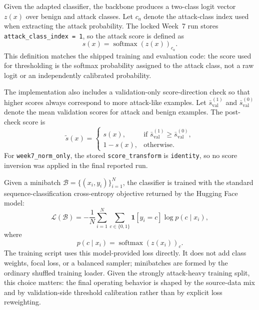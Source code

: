 Given the adapted classifier, the backbone produces a two-class logit vector $z(x)$ over benign and attack classes. Let $c_a$ denote the attack-class index used when extracting the attack probability. The locked Week~7 run stores \texttt{attack\_class\_index = 1}, so the attack score is defined as
\begin{equation}
  s(x) = \operatorname{softmax}(z(x))_{c_a}.
\end{equation}
This definition matches the shipped training and evaluation code: the score used for thresholding is the softmax probability assigned to the attack class, not a raw logit or an independently calibrated probability.

The implementation also includes a validation-only score-direction check so that higher scores always correspond to more attack-like examples. Let $\bar{s}^{(1)}_{\mathrm{val}}$ and $\bar{s}^{(0)}_{\mathrm{val}}$ denote the mean validation scores for attack and benign examples. The post-check score is
\begin{equation}
  \tilde{s}(x) =
  \begin{cases}
    s(x), & \text{if } \bar{s}^{(1)}_{\mathrm{val}} \ge \bar{s}^{(0)}_{\mathrm{val}}, \\
    1 - s(x), & \text{otherwise.}
  \end{cases}
\end{equation}
For \texttt{week7\_norm\_only}, the stored \texttt{score\_transform} is \texttt{identity}, so no score inversion was applied in the final reported run.

Given a minibatch $\mathcal{B} = \{(x_i, y_i)\}_{i=1}^{N}$, the classifier is trained with the standard sequence-classification cross-entropy objective returned by the Hugging Face model:
\begin{equation}
  \mathcal{L}(\mathcal{B}) = -\frac{1}{N} \sum_{i=1}^{N} \sum_{c \in \{0,1\}} \mathbf{1}[y_i = c] \log p(c \mid x_i),
\end{equation}
where
\begin{equation}
  p(c \mid x_i) = \operatorname{softmax}(z(x_i))_c.
\end{equation}
The training script uses this model-provided loss directly. It does not add class weights, focal loss, or a balanced sampler; minibatches are formed by the ordinary shuffled training loader. Given the strongly attack-heavy training split, this choice matters: the final operating behavior is shaped by the source-data mix and by validation-side threshold calibration rather than by explicit loss reweighting.

